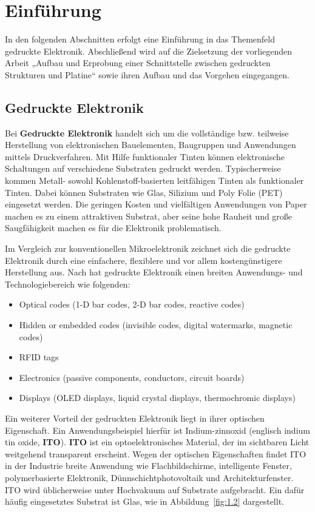 \chapter{Einführung}
In den folgenden Abschnitten erfolgt eine Einführung in das Themenfeld gedruckte Elektronik. Abschließend wird auf die Zielsetzung der vorliegenden Arbeit „Aufbau und Erprobung einer Schnittstelle zwischen gedruckten Strukturen und Platine“ sowie ihren Aufbau und das Vorgehen eingegangen.
\section{Gedruckte Elektronik}
\label{sec:Gedruckte Elektronik}
Bei {\bf Gedruckte Elektronik} handelt sich um die vollständige bzw. teilweise Herstellung von elektronischen Bauelementen, Baugruppen und Anwendungen mittels Druckverfahren\cite{1}. Mit Hilfe funktionaler Tinten können elektronische Schaltungen auf verschiedene Substraten gedruckt werden. Typischerweise kommen Metall- sowohl Kohlenstoff-basierten leitfähigen Tinten als funktionaler Tinten. Dabei können Substraten wie Glas, Silizium und Poly Folie (PET) eingesetzt werden. Die geringen Kosten und vielfältigen Anwendungen von Paper machen es zu einem attraktiven Substrat, aber seine hohe Rauheit und große Saugfähigkeit machen es für die Elektronik problematisch\cite{2}.

Im Vergleich zur konventionellen Mikroelektronik zeichnet sich die gedruckte Elektronik durch eine einfachere, flexiblere und vor allem kostengünstigere Herstellung aus\cite{3}. Nach \cite{4} hat gedruckte Elektronik einen breiten Anwendungs- und Technologiebereich wie folgenden:

\begin{itemize}
\item Optical codes (1-D bar codes, 2-D bar codes, reactive codes)
\item Hidden or embedded codes (invisible codes, digital watermarks, magnetic codes)
\item RFID tags
\item Electronics (passive components, conductors, circuit boards)
\item Displays (OLED displays, liquid crystal displays, thermochromic displays)
\end{itemize}

Ein weiterer Vorteil der gedruckten Elektronik liegt in ihrer optischen Eigenschaft. Ein Anwendungsbeispiel hierfür ist Indium-zinnoxid (englisch indium tin oxide, {\bf ITO}). {\bf ITO} ist ein optoelektronisches Material, der im sichtbaren Licht weitgehend transparent erscheint. Wegen der optischen Eigenschaften findet ITO in der Industrie breite Anwendung wie Flachbildschirme, intelligente Fenster, polymerbasierte Elektronik, Dünnschichtphotovoltaik und Architekturfenster. ITO wird üblicherweise unter Hochvakuum auf Substrate aufgebracht. Ein dafür häufig eingesetztes Substrat ist Glas, wie in Abbildung~\ref{fig:1.2} dargestellt.

